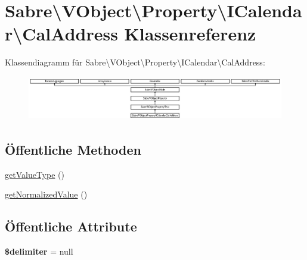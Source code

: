 \hypertarget{class_sabre_1_1_v_object_1_1_property_1_1_i_calendar_1_1_cal_address}{}\section{Sabre\textbackslash{}V\+Object\textbackslash{}Property\textbackslash{}I\+Calendar\textbackslash{}Cal\+Address Klassenreferenz}
\label{class_sabre_1_1_v_object_1_1_property_1_1_i_calendar_1_1_cal_address}
Klassendiagramm für Sabre\textbackslash{}V\+Object\textbackslash{}Property\textbackslash{}I\+Calendar\textbackslash{}Cal\+Address\+:\begin{figure}[H]
\begin{center}
\leavevmode
\includegraphics[height=1.958042cm]{class_sabre_1_1_v_object_1_1_property_1_1_i_calendar_1_1_cal_address}
\end{center}
\end{figure}
\subsection*{Öffentliche Methoden}
\begin{DoxyCompactItemize}
\item 
\mbox{\hyperlink{class_sabre_1_1_v_object_1_1_property_1_1_i_calendar_1_1_cal_address_aab15143a7f1484249653acd6fb884979}{get\+Value\+Type}} ()
\item 
\mbox{\hyperlink{class_sabre_1_1_v_object_1_1_property_1_1_i_calendar_1_1_cal_address_a298550cee9679695690cd6fba859b79f}{get\+Normalized\+Value}} ()
\end{DoxyCompactItemize}
\subsection*{Öffentliche Attribute}
\begin{DoxyCompactItemize}
\item 
\mbox{\label{class_sabre_1_1_v_object_1_1_property_1_1_i_calendar_1_1_cal_address_a8ce74bfe87fb827f677e95e873ae07b8}} 
{\bfseries \$delimiter} = null
\end{DoxyCompactItemize}
